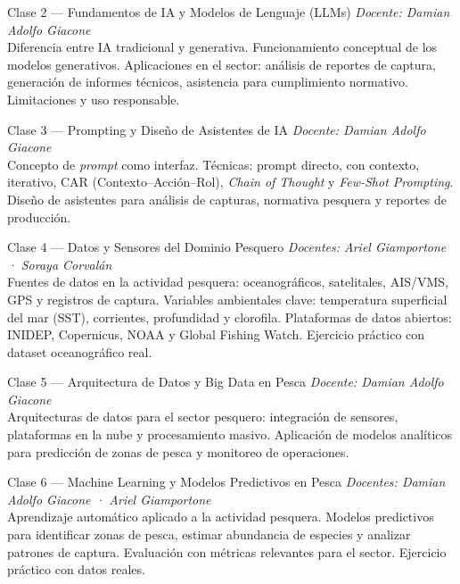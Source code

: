 \documentclass[12pt,a4paper]{article}
\begin{document}
\begin{clasebox}{Clase 2 — Fundamentos de IA y Modelos de Lenguaje (LLMs)}
  \textit{Docente: Damian Adolfo Giacone}\\[4pt]
  Diferencia entre IA tradicional y generativa. Funcionamiento conceptual de los modelos generativos. Aplicaciones en el sector: análisis de reportes de captura, generación de informes técnicos, asistencia para cumplimiento normativo. Limitaciones y uso responsable.
\end{clasebox}

\begin{clasebox}{Clase 3 — Prompting y Diseño de Asistentes de IA}
  \textit{Docente: Damian Adolfo Giacone}\\[4pt]
  Concepto de \textit{prompt} como interfaz. Técnicas: prompt directo, con contexto, iterativo, CAR (Contexto--Acción--Rol), \textit{Chain of Thought} y \textit{Few-Shot Prompting}. Diseño de asistentes para análisis de capturas, normativa pesquera y reportes de producción.
\end{clasebox}

\begin{clasebox}{Clase 4 — Datos y Sensores del Dominio Pesquero}
  \textit{Docentes: Ariel Giamportone · Soraya Corvalán}\\[4pt]
  Fuentes de datos en la actividad pesquera: oceanográficos, satelitales, AIS/VMS, GPS y registros de captura. Variables ambientales clave: temperatura superficial del mar (SST), corrientes, profundidad y clorofila. Plataformas de datos abiertos: INIDEP, Copernicus, NOAA y Global Fishing Watch. Ejercicio práctico con dataset oceanográfico real.
\end{clasebox}

\begin{clasebox}{Clase 5 — Arquitectura de Datos y Big Data en Pesca}
  \textit{Docente: Damian Adolfo Giacone}\\[4pt]
  Arquitecturas de datos para el sector pesquero: integración de sensores, plataformas en la nube y procesamiento masivo. Aplicación de modelos analíticos para predicción de zonas de pesca y monitoreo de operaciones.
\end{clasebox}

\begin{clasebox}{Clase 6 — Machine Learning y Modelos Predictivos en Pesca}
  \textit{Docentes: Damian Adolfo Giacone · Ariel Giamportone}\\[4pt]
  Aprendizaje automático aplicado a la actividad pesquera. Modelos predictivos para identificar zonas de pesca, estimar abundancia de especies y analizar patrones de captura. Evaluación con métricas relevantes para el sector. Ejercicio práctico con datos reales.
\end{clasebox}
\end{document}
